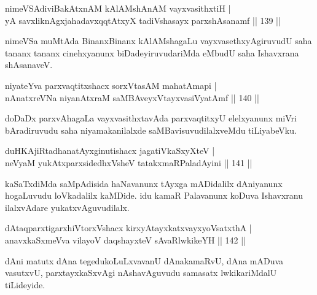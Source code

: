 
\begin{shl}
nimeVSAdiviBakAtxnAM kAlAMshAnAM vayxvasithxtiH |\\
yA savxliknAgxjahadavxqqtAtxyX tadiVshasayx parxshAsanamf \hfill || 139 ||
\end{shl}

\begin{artha}
nimeVSa muMtAda BinanxBinanx kAlAMshagaLu vayxvasethxyAgiruvudU saha tananx tananx cinehxyanunx biDadeyiruvudariMda eMbudU saha Ishavxrana shAsanaveV.
\end{artha}


\begin{shl}
niyateYva parxvaqtitxshacx sorxVtasAM mahatAmapi |\\
nAnatxreVNa niyanAtxraM saMBAveyxVtayxvasiVyatAmf \hfill || 140 ||
\end{shl}

\begin{artha}
doDaDx parxvAhagaLa vayxvasithxtavAda parxvaqtitxyU elelxyanunx miVri bAradiru\-vudu saha niyamakanilalxde saMBavisuvudilalxveMdu tiLiyabeVku.
\end{artha}

\begin{shl}
duHKAjiRtadhanatAyxginutishacx jagatiVkaSxyXteV |\\
neVyaM yukAtx\s parxsidedhxVsheV tatakxmaRPaladAyini \hfill || 141 ||
\end{shl}

\begin{artha}
kaSaTxdiMda saMpAdisida haNavanunx tAyxga mADidalilx dAniyanunx hogaLuvudu loVkadalilx kaMDide. idu kamaR Palavanunx koDuva Ishavxranu ilalxvAdare yukatxvAguvudilalx.
\end{artha}


\begin{shl}
dAtaqparxtigarxhiVtorxVshacx kirxyAtayxkatxvayxyoVsatxthA |\\
anavxkaSxmeVva vilayoV daqshayxteV sAvaRlwkikeYH \hfill || 142 ||
\end{shl}

\begin{artha}
dAni matutx dAna tegedukoLuLxvavanU dAnakamaRvU, dAna mADuva vasutxvU, parxtayxkaSxvAgi nAshavAguvudu samasatx lwkikariMdalU tiLideyide.
\end{artha}

